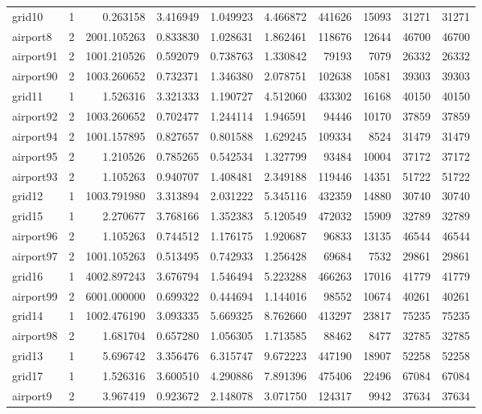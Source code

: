 \documentclass[../../../thesis.tex]{subfiles}
\begin{document}
\begin{longtable}{|l|r|r|r|r|r|r|r|r|r|}
grid10 & 1 & 0.263158 & 3.416949 & 1.049923 & 4.466872 & 441626 & 15093 & 31271 & 31271 \\
airport8 & 2 & 2001.105263 & 0.833830 & 1.028631 & 1.862461 & 118676 & 12644 & 46700 & 46700 \\
airport91 & 2 & 1001.210526 & 0.592079 & 0.738763 & 1.330842 & 79193 & 7079 & 26332 & 26332 \\
airport90 & 2 & 1003.260652 & 0.732371 & 1.346380 & 2.078751 & 102638 & 10581 & 39303 & 39303 \\
grid11 & 1 & 1.526316 & 3.321333 & 1.190727 & 4.512060 & 433302 & 16168 & 40150 & 40150 \\
airport92 & 2 & 1003.260652 & 0.702477 & 1.244114 & 1.946591 & 94446 & 10170 & 37859 & 37859 \\
airport94 & 2 & 1001.157895 & 0.827657 & 0.801588 & 1.629245 & 109334 & 8524 & 31479 & 31479 \\
airport95 & 2 & 1.210526 & 0.785265 & 0.542534 & 1.327799 & 93484 & 10004 & 37172 & 37172 \\
airport93 & 2 & 1.105263 & 0.940707 & 1.408481 & 2.349188 & 119446 & 14351 & 51722 & 51722 \\
grid12 & 1 & 1003.791980 & 3.313894 & 2.031222 & 5.345116 & 432359 & 14880 & 30740 & 30740 \\
grid15 & 1 & 2.270677 & 3.768166 & 1.352383 & 5.120549 & 472032 & 15909 & 32789 & 32789 \\
airport96 & 2 & 1.105263 & 0.744512 & 1.176175 & 1.920687 & 96833 & 13135 & 46544 & 46544 \\
airport97 & 2 & 1001.105263 & 0.513495 & 0.742933 & 1.256428 & 69684 & 7532 & 29861 & 29861 \\
grid16 & 1 & 4002.897243 & 3.676794 & 1.546494 & 5.223288 & 466263 & 17016 & 41779 & 41779 \\
airport99 & 2 & 6001.000000 & 0.699322 & 0.444694 & 1.144016 & 98552 & 10674 & 40261 & 40261 \\
grid14 & 1 & 1002.476190 & 3.093335 & 5.669325 & 8.762660 & 413297 & 23817 & 75235 & 75235 \\
airport98 & 2 & 1.681704 & 0.657280 & 1.056305 & 1.713585 & 88462 & 8477 & 32785 & 32785 \\
grid13 & 1 & 5.696742 & 3.356476 & 6.315747 & 9.672223 & 447190 & 18907 & 52258 & 52258 \\
grid17 & 1 & 1.526316 & 3.600510 & 4.290886 & 7.891396 & 475406 & 22496 & 67084 & 67084 \\
airport9 & 2 & 3.967419 & 0.923672 & 2.148078 & 3.071750 & 124317 & 9942 & 37634 & 37634 \\

\end{longtable}
\end{document}
